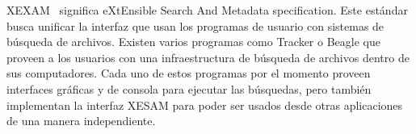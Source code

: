 XEXAM~\cite{xesam:website} significa eXtEnsible Search And Metadata specification. Este estándar busca unificar la interfaz que usan los programas de usuario con sistemas de búsqueda de archivos. Existen varios programas como Tracker o Beagle que proveen a los usuarios con una infraestructura de búsqueda de archivos dentro de sus computadores. Cada uno de estos programas por el momento proveen interfaces gráficas y de consola para ejecutar las búsquedas, pero también implementan la interfaz XESAM para poder ser usados desde otras aplicaciones de una manera independiente.



